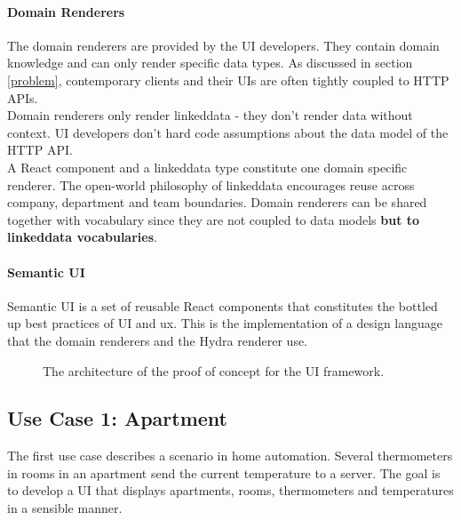 \paragraph{Domain Renderers}
The domain renderers are provided by the UI developers. They contain domain knowledge and can only render specific data types. As discussed in section \ref{problem}, contemporary clients and their UIs are often tightly coupled to HTTP APIs. \\
Domain renderers only render \gls{linkeddata} - they don't render data without context. UI developers don't hard code assumptions about the data model of the HTTP API. \\
A React component and a \gls{linkeddata} type constitute one domain specific renderer. The open-world philosophy of \gls{linkeddata} encourages reuse across company, department and team boundaries. Domain renderers can be shared together with vocabulary since they are not coupled to data models \textbf{but to \gls{linkeddata} vocabularies}.

\paragraph{Semantic UI}
Semantic UI is a set of reusable React components that constitutes the bottled up best practices of UI and \gls{ux}. This is the implementation of a design language that the domain renderers and the Hydra renderer use.

\begin{figure}[!htb]
  \caption{The architecture of the proof of concept for the UI framework.}
  \label{fig:pocarchitecture}
\end{figure}

\subsection{Use Case 1: Apartment}\label{sec:usecase1}
The first use case describes a scenario in home automation. Several thermometers in rooms in an apartment send the current temperature to a server. The goal is to develop a UI that displays apartments, rooms, thermometers and temperatures in a sensible manner.


